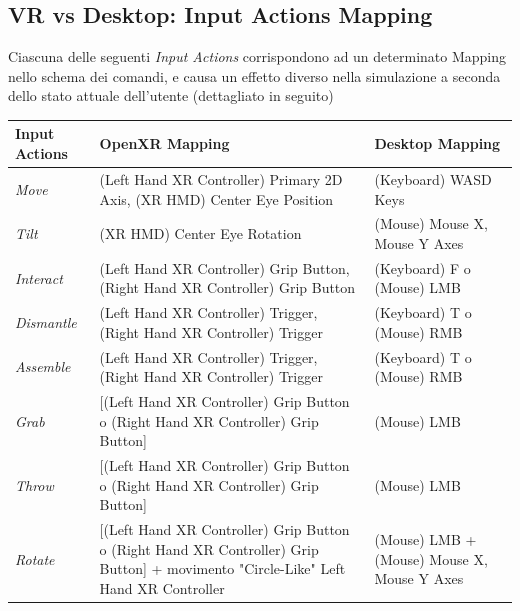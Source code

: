 \documentclass[10pt, openany]{article}
\begin{document}
    \setcounter{footnote}{6}
    \subsection{VR vs Desktop: Input Actions Mapping}\label{vr:commands}
    Ciascuna delle seguenti \textit{Input Actions} corrispondono ad un determinato Mapping nello schema dei comandi, e causa un effetto diverso nella simulazione a 
    seconda dello stato attuale dell'utente (dettagliato in seguito)
    \begin{table}[h!]
      \centering
      \begin{tabular}{@{} p{} p{} p{} @{}}
        \toprule
        \textbf{Input Actions} & \textbf{OpenXR Mapping} & \textbf{Desktop Mapping} \\
        \midrule
        \textit{Move} & (Left Hand XR Controller) Primary 2D Axis, (XR HMD) Center Eye Position & (Keyboard) WASD Keys \\
        \textit{Tilt} & (XR HMD) Center Eye Rotation & (Mouse) Mouse X, Mouse Y Axes \\
        \textit{Interact} & (Left Hand XR Controller) Grip Button, (Right Hand XR Controller) Grip Button & (Keyboard) F o (Mouse) LMB \\
        \textit{Dismantle} & (Left Hand XR Controller) Trigger, (Right Hand XR Controller) Trigger & (Keyboard) T o (Mouse) RMB \\
        \textit{Assemble} & (Left Hand XR Controller) Trigger, (Right Hand XR Controller) Trigger & (Keyboard) T o (Mouse) RMB \\
        \textit{Grab} & [(Left Hand XR Controller) Grip Button o (Right Hand XR Controller) Grip Button] & (Mouse) LMB \\
        \textit{Throw} & [(Left Hand XR Controller) Grip Button o (Right Hand XR Controller) Grip Button] & (Mouse) LMB \\
        \textit{Rotate} & [(Left Hand XR Controller) Grip Button o (Right Hand XR Controller) Grip Button]\footnotemark 
          + movimento "Circle-Like" Left Hand XR Controller & (Mouse) LMB + (Mouse) Mouse X, Mouse Y Axes \\

\end{tabular}
\end{table}
\end{document}
